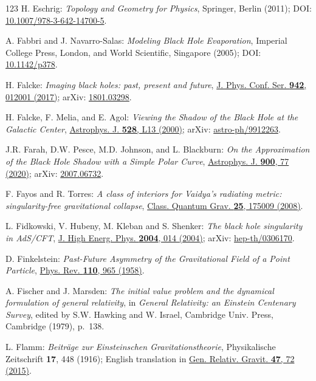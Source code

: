 \begin{thebibliography}{123}
H. Eschrig: {\em Topology and Geometry for Physics},
Springer, Berlin (2011);
DOI: \href{https://doi.org/10.1007/978-3-642-14700-5}{10.1007/978-3-642-14700-5}.

A. Fabbri and J. Navarro-Salas:
{\em Modeling Black Hole Evaporation},
Imperial College Press, London, and World Scientific, Singapore (2005);
DOI: \href{https://doi.org/10.1142/p378}{10.1142/p378}.

H. Falcke:
{\em Imaging black holes: past, present and future},
\href{https://doi.org/10.1088/1742-6596/942/1/012001}{J. Phys. Conf. Ser. {\bf 942}, 012001 (2017)};
arXiv: \href{https://arxiv.org/abs/1801.03298}{1801.03298}.

H. Falcke, F. Melia, and E. Agol:
{\em Viewing the Shadow of the Black Hole at the Galactic Center},
\href{https://doi.org/10.1086/312423}{Astrophys. J. {\bf 528}, L13 (2000)};
arXiv: \href{https://arxiv.org/abs/astro-ph/9912263}{astro-ph/9912263}.

J.R. Farah, D.W. Pesce, M.D. Johnson, and L. Blackburn:
{\em On the Approximation of the Black Hole Shadow with a Simple Polar Curve},
\href{https://doi.org/10.3847/1538-4357/aba59a}{Astrophys. J. {\bf 900}, 77 (2020)};
arXiv: \href{https://arxiv.org/abs/2007.06732}{2007.06732}.

F. Fayos and R. Torres:
{\em A class of interiors for Vaidya's radiating metric: singularity-free gravitational collapse},
\href{https://doi.org/10.1088/0264-9381/25/17/175009}{Class. Quantum Grav. {\bf 25}, 175009 (2008)}.

L. Fidkowski, V. Hubeny, M. Kleban and S. Shenker:
{\em The black hole singularity in AdS/CFT},
\href{https://doi.org/10.1088/1126-6708/2004/02/014}{J. High Energ. Phys. {\bf 2004}, 014 (2004)};
arXiv: \href{https://arxiv.org/abs/hep-th/0306170}{hep-th/0306170}.

D. Finkelstein:
{\em Past-Future Asymmetry of the Gravitational Field of a Point Particle},
\href{https://doi.org/10.1103/PhysRev.110.965}{Phys. Rev. {\bf 110}, 965 (1958)}.

A. Fischer and J. Marsden:
{\em The initial value problem and the dynamical formulation of general relativity},
in {\em General Relativity: an Einstein
Centenary Survey}, edited by S.W. Hawking and W. Israel,
Cambridge Univ. Press, Cambridge (1979), p.~138.

L. Flamm: {\em Beiträge zur Einsteinschen Gravitationstheorie},
Physikalische Zeitschrift {\bf 17}, 448 (1916); English translation in
\href{https://doi.org/10.1007/s10714-015-1908-2}{Gen. Relativ. Gravit. {\bf 47}, 72 (2015)}.


\end{thebibliography}
